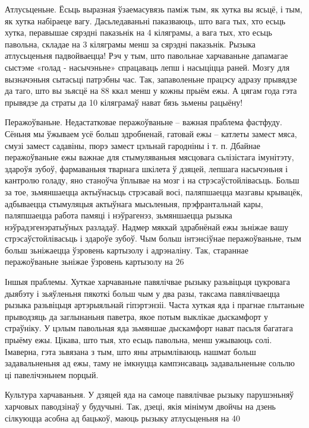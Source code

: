 Атлусьценьне.
Ёсьць выразная ўзаемасувязь паміж тым, як хутка вы ясьцё, і тым, як хутка набіраеце вагу. Дасьледаваньні паказваюць, што вага тых, хто есьць хутка, перавышае сярэдні паказьнік на 4 кіляграмы, а вага тых, хто есьць павольна, складае на 3 кіляграмы менш за сярэдні паказьнік. Рызыка атлусьценьня падвойваецца! Рэч у тым, што павольнае харчаваньне дапамагае сыстэме «голад - насычэньне» спрацаваць лепш і насыціцца раней. Мозгу для вызначэньня сытасьці патрэбны час. Так, запаволеньне працэсу адразу прывядзе да таго, што вы зьясцё на 88 ккал менш у кожны прыём ежы. А цягам года гэта прывядзе да страты да 10 кіляграмаў нават бязь зьмены рацыёну!

Перажоўваньне.
Недастатковае перажоўваньне – важная праблема фастфуду. Сёньня мы ўжываем усё больш здробненай, гатовай ежы – катлеты замест мяса, смузі замест садавіны, пюрэ замест цэльнай гародніны і т. п. Дбайнае перажоўваньне ежы важнае для стымуляваньня мясцовага сьлізістага імунітэту, здароўя зубоў, фармаваньня тварнага шкілета ў дзяцей, лепшага насычэньня і кантролю голаду, яно станоўча ўплывае на мозг і на стрэсаўстойлівасьць. Больш за тое, зьмяншаецца актыўнасьць стрэсавай восі, паляпшаецца мазгавы крывацёк, адбываецца стымуляцыя актыўнага мысьленьня, прэфрантальнай кары, паляпшаецца работа памяці і нэўрагенэз, зьмяншаецца рызыка нэўрадэгенэратыўных разладаў. Надмер мяккай здрабнёнай ежы зьніжае вашу стрэсаўстойлівасьць і здароўе зубоў. Чым больш інтэнсіўнае перажоўваньне, тым больш зьніжаецца ўзровень картызолу і адрэналіну. Так, стараннае перажоўваньне зьніжае ўзровень картызолу на 26%

Іншыя праблемы.
Хуткае харчаваньне павялічвае рызыку разьвіцьця цукровага дыябэту і зьяўленьня пякоткі больш чым у два разы, таксама павялічваецца рызыка разьвіцьця артэрыяльнай гіпэртэнзіі. Часта хуткая яда і прагнае глытаньне прыводзяць да заглынаньня паветра, якое потым выклікае дыскамфорт у страўніку. У цэлым павольная яда зьмяншае дыскамфорт нават пасьля багатага прыёму ежы. Цікава, што тыя, хто есьць павольна, менш ужываюць солі. Імаверна, гэта зьвязана з тым, што яны атрымліваюць нашмат больш задавальненьня ад ежы, таму не імкнуцца кампэнсаваць задавальненьне сольлю ці павелічэньнем порцый.

Культура харчаваньня.
У дзяцей яда на самоце павялічвае рызыку парушэньняў харчовых паводзінаў у будучыні. Так, дзеці, якія мінімум двойчы на дзень сілкуюцца асобна ад бацькоў, маюць рызыку атлусьценьня на 40%

